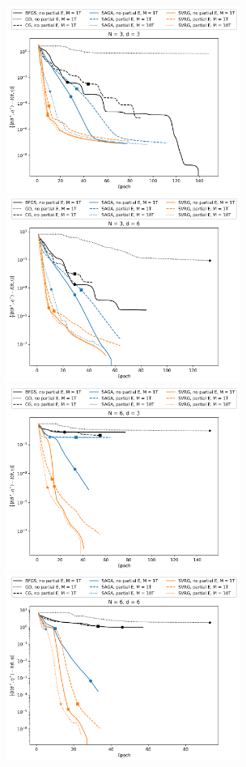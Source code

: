 \begin{figure}
    \centering
    \includegraphics[width=3in]{../plt/log-like_v_epoch_T-100000-K-3-1-d-3-000.png}
    \includegraphics[width=3in]{../plt/log-like_v_epoch_T-100000-K-3-1-d-6-000.png}
    \\
    \includegraphics[width=3in]{../plt/log-like_v_epoch_T-100000-K-6-1-d-3-000.png}
    \includegraphics[width=3in]{../plt/log-like_v_epoch_T-100000-K-6-1-d-6-000.png}   

\end{figure}
